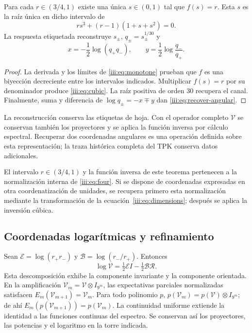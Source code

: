 \begin{theorem}
Para cada $r\in(3/4,1)$ existe una única $s\in(0,1)$ tal que $f(s)=r$.
Esta $s$ es la raíz única en dicho intervalo de
\begin{equation}
 r s^3+(r-1)(1+s+s^2)=0.
 \label{iii:eq:cubic}
\end{equation}
La respuesta etiquetada reconstruye $s_\pm$, $q_\pm=s_\pm^{1/30}$ y
\begin{equation}
 x=-\frac12\log(q_+q_-),\qquad
 y=\frac12\log\frac{q_-}{q_+}.
 \label{iii:eq:recover-angular}
\end{equation}
\end{theorem}
\begin{proof}
La derivada y los límites de \eqref{iii:eq:monotone} prueban que $f$ es una
biyección decreciente entre los intervalos indicados. Multiplicar $f(s)=r$
por su denominador produce \eqref{iii:eq:cubic}. La raíz positiva de orden
$30$ recupera el canal. Finalmente, suma y diferencia de
$\log q_\pm=-x\mp y$ dan \eqref{iii:eq:recover-angular}.
\end{proof}

La reconstrucción conserva las etiquetas de hoja. Con el operador completo
$\mathcal V$ se conservan también los proyectores y se aplica la función
inversa por cálculo espectral. Recuperar dos coordenadas angulares es una
operación definida sobre esta representación; la traza histórica completa
del TPK conserva datos adicionales.

El intervalo $r\in(3/4,1)$ y la función inversa de este teorema pertenecen
a la normalización interna de \eqref{iii:eq:four}. Si se dispone de
coordenadas expresadas en otra coordenatización de unidades, se recupera primero
esta normalización mediante la transformación de la
ecuación~\eqref{iii:eq:dimensions}; después se aplica la inversión cúbica.

\subsection{Coordenadas logarítmicas y refinamiento}

Sean $\mathcal E=\log(r_+r_-)$ y $\mathcal B=\log(r_-/r_+)$. Entonces
\begin{equation}
 \log\mathcal V=\tfrac12\mathcal E I-\tfrac12\mathcal B\mathcal R.
 \label{iii:eq:logvac}
\end{equation}
Esta descomposición exhibe la componente invariante y la componente orientada.
En la amplificación $\mathcal V_m=\mathcal V\otimes I_{9^m}$, las
expectativas parciales normalizadas satisfacen
$E_m(\mathcal V_{m+1})=\mathcal V_m$. Para todo polinomio $p$,
$p(\mathcal V_m)=p(\mathcal V)\otimes I_{9^m}$; de ahí
$E_m(p(\mathcal V_{m+1}))=p(\mathcal V_m)$. La continuidad uniforme
extiende la identidad a las funciones continuas del espectro. Se conservan
así los proyectores, las potencias y el logaritmo en la torre indicada.

